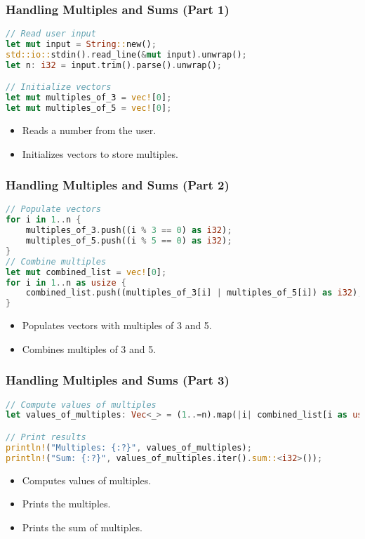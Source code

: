 \documentclass[aspectratio=169, table]{beamer}
\begin{document}
\begin{frame}[fragile]
\frametitle{Handling Multiples and Sums (Part 1)}
\begin{lstlisting}[language=Rust]
// Read user input
let mut input = String::new();
std::io::stdin().read_line(&mut input).unwrap();
let n: i32 = input.trim().parse().unwrap();

// Initialize vectors
let mut multiples_of_3 = vec![0];
let mut multiples_of_5 = vec![0]; 
\end{lstlisting}
\begin{itemize}
\item Reads a number from the user.
\item Initializes vectors to store multiples.
\end{itemize}
\end{frame}

\begin{frame}[fragile]
\frametitle{Handling Multiples and Sums (Part 2)}
\begin{lstlisting}[language=Rust]
// Populate vectors
for i in 1..n {
	multiples_of_3.push((i % 3 == 0) as i32);
	multiples_of_5.push((i % 5 == 0) as i32);
}
// Combine multiples
let mut combined_list = vec![0]; 
for i in 1..n as usize {
	combined_list.push((multiples_of_3[i] | multiples_of_5[i]) as i32);
}	
\end{lstlisting}
\begin{itemize}
\item Populates vectors with multiples of 3 and 5.
\item Combines multiples of 3 and 5.
\end{itemize}
\end{frame}

\begin{frame}[fragile]
\frametitle{Handling Multiples and Sums (Part 3)}
\begin{lstlisting}[language=Rust]
// Compute values of multiples
let values_of_multiples: Vec<_> = (1..=n).map(|i| combined_list[i as usize] * i).collect();

// Print results
println!("Multiples: {:?}", values_of_multiples);  
println!("Sum: {:?}", values_of_multiples.iter().sum::<i32>());
\end{lstlisting}
\begin{itemize}
\item Computes values of multiples.
\item Prints the multiples.
\item Prints the sum of multiples.
\end{itemize}
\end{frame}
\end{document}
